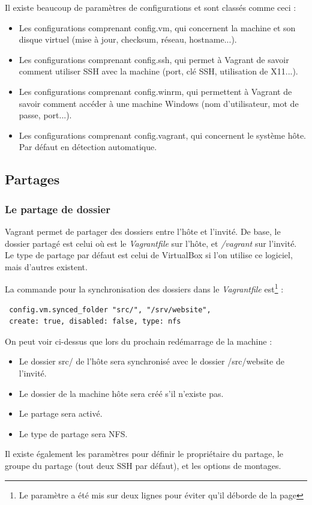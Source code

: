 \documentclass[12pt,a4paper]{article}
\begin{document}
Il existe beaucoup de paramètres de configurations et sont classés comme ceci : 
\begin{itemize}
	\item{Les configurations comprenant config.vm, qui concernent la machine et son disque virtuel (mise à jour, checksum, réseau, hostname...).}
	\item{Les configurations comprenant config.ssh, qui permet à Vagrant de savoir comment utiliser SSH avec la machine (port, clé SSH, utilisation de X11...).} 
	\item{Les configurations comprenant config.winrm, qui permettent à Vagrant de savoir comment accéder à une machine Windows (nom d'utilisateur, mot de passe, port...).}
	\item{Les configurations comprenant config.vagrant, qui concernent le système hôte. Par défaut en détection automatique.}
\end{itemize}

\subsection{Partages}

\subsubsection{Le partage de dossier}
Vagrant permet de partager des dossiers entre l'hôte et l'invité. De base, le dossier partagé est celui où est le \textit{Vagrantfile} sur l'hôte, et \textit{/vagrant} sur l'invité. Le type de partage par défaut est celui de VirtualBox si l'on utilise ce logiciel, mais d'autres existent.

La commande pour la synchronisation des dossiers dans le \textit{Vagrantfile} est\footnote{Le paramètre a été mis sur deux lignes pour éviter qu'il déborde de la page} :
\begin{lstlisting}
 config.vm.synced_folder "src/", "/srv/website", 
 create: true, disabled: false, type: nfs
\end{lstlisting}
On peut voir ci-dessus que lors du prochain redémarrage de la machine :
\begin{itemize}
	\item{Le dossier src/ de l'hôte sera synchronisé avec le dossier /src/website de l'invité.}
	\item{Le dossier de la machine hôte sera créé s'il n'existe pas.}
	\item{Le partage sera activé.}
	\item{Le type de partage sera NFS.}
\end{itemize}
Il existe également les paramètres pour définir le propriétaire du partage, le groupe du partage (tout deux SSH par défaut), et les options de montages.
\end{document}

